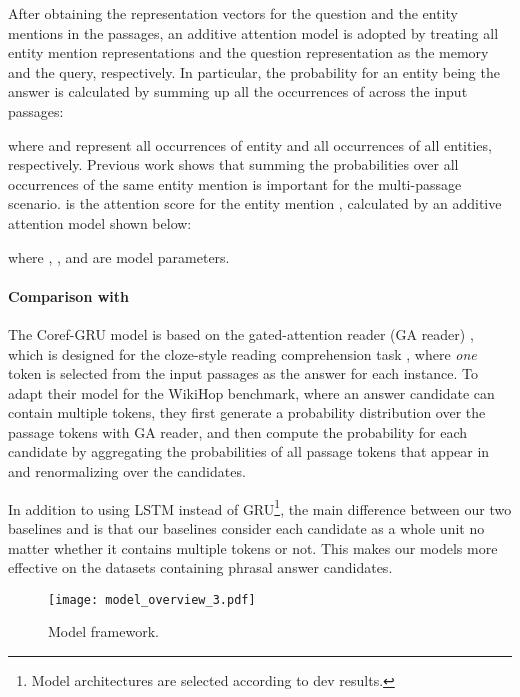 \documentclass[letterpaper]{article}
\begin{document}
After obtaining the representation vectors for the question and the entity mentions in the passages, an additive attention model \citep{bahdanau2015neural}
is adopted by treating all entity mention representations and the question representation as the memory and the query, respectively.
In particular, the probability for an entity  being the answer is calculated by summing up all the occurrences of  across the input passages:

where  and  represent all occurrences of entity  and all occurrences of all entities, respectively. 
Previous work \citep{wang2018r3} shows that summing the probabilities over all occurrences of the same entity mention is important for the multi-passage scenario.
 is the attention score for the entity mention , calculated by an additive attention model shown below:

where , ,  and  are model parameters.


\paragraph{Comparison with \citet{N18-2007}}
The Coref-GRU model \citep{N18-2007} is based on the gated-attention reader (GA reader) \citep{dhingra-EtAl:2017:Long2}, which is designed for the cloze-style reading comprehension task \citep{hermann2015teaching}, where \emph{one} token is selected from the input passages as the answer for each instance.
To adapt their model for the WikiHop benchmark, where an answer candidate can contain multiple tokens, they first generate a probability distribution over the passage tokens with GA reader, and then compute the probability for each candidate  by aggregating the probabilities of all passage tokens that appear in  and renormalizing over the candidates.




In addition to using LSTM instead of GRU\footnote{Model architectures are selected according to dev results.}, the main difference between our two baselines and \citet{N18-2007} is that our baselines consider each candidate as a whole unit no matter whether it contains multiple tokens or not. 
This makes our models more effective on the datasets containing phrasal answer candidates.

\begin{figure}
\centering
\texttt{[image: model\_overview\_3.pdf]}
\vspace{-0.5em}
\caption{Model framework.}
\label{fig:model_overview}
\vspace{-1.0em}
\end{figure}
\end{document}
